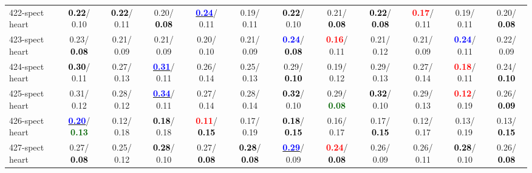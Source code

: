 \begin{table}[h]
\begin{center}
{\begin{tabular}{lc|c|c|c|c|c|c|c|c|c|c}
422-spect heart & \textcolor{black}{\textbf{  0.22}}/  0.10 & \textcolor{black}{\textbf{  0.22}}/  0.11 &   0.20/\textcolor{black}{\textbf{  0.08}} & \underline{\textcolor{blue}{\textbf{  0.24}}}/  0.11 &   0.19/  0.11 & \textcolor{black}{\textbf{  0.22}}/  0.10 &   0.21/\textcolor{black}{\textbf{  0.08}} & \textcolor{black}{\textbf{  0.22}}/\textcolor{black}{\textbf{  0.08}} & \textcolor{red}{\textbf{  0.17}}/  0.11 &   0.19/  0.11 &   0.20/\textcolor{black}{\textbf{  0.08}} \\
423-spect heart &   0.23/\textcolor{black}{\textbf{  0.08}} &   0.21/  0.09 &   0.21/  0.09 &   0.20/  0.10 &   0.21/  0.09 & \textcolor{blue}{\textbf{  0.24}}/\textcolor{black}{\textbf{  0.08}} & \textcolor{red}{\textbf{  0.16}}/  0.11 &   0.21/  0.12 &   0.21/  0.09 & \textcolor{blue}{\textbf{  0.24}}/  0.11 &   0.22/  0.09 \\ \hline
424-spect heart & \textcolor{black}{\textbf{  0.30}}/  0.11 &   0.27/  0.13 & \underline{\textcolor{blue}{\textbf{  0.31}}}/  0.11 &   0.26/  0.14 &   0.25/  0.13 &   0.29/\textcolor{black}{\textbf{  0.10}} &   0.19/  0.12 &   0.29/  0.13 &   0.27/  0.14 & \textcolor{red}{\textbf{  0.18}}/  0.11 &   0.24/\textcolor{black}{\textbf{  0.10}} \\
425-spect heart &   0.31/  0.12 &   0.28/  0.12 & \underline{\textcolor{blue}{\textbf{  0.34}}}/  0.11 &   0.27/  0.14 &   0.28/  0.14 & \textcolor{black}{\textbf{  0.32}}/  0.10 &   0.29/\textcolor{darkgreen}{\textbf{  0.08}} & \textcolor{black}{\textbf{  0.32}}/  0.10 &   0.29/  0.13 & \textcolor{red}{\textbf{  0.12}}/  0.19 &   0.26/\textcolor{black}{\textbf{  0.09}} \\
426-spect heart & \underline{\textcolor{blue}{\textbf{  0.20}}}/\textcolor{darkgreen}{\textbf{  0.13}} &   0.12/  0.18 & \textcolor{black}{\textbf{  0.18}}/  0.18 & \textcolor{red}{\textbf{  0.11}}/\textcolor{black}{\textbf{  0.15}} &   0.17/  0.19 & \textcolor{black}{\textbf{  0.18}}/\textcolor{black}{\textbf{  0.15}} &   0.16/  0.17 &   0.17/\textcolor{black}{\textbf{  0.15}} &   0.12/  0.17 &   0.13/  0.19 &   0.13/\textcolor{black}{\textbf{  0.15}} \\
427-spect heart &   0.27/\textcolor{black}{\textbf{  0.08}} &   0.25/  0.12 & \textcolor{black}{\textbf{  0.28}}/  0.10 &   0.27/\textcolor{black}{\textbf{  0.08}} & \textcolor{black}{\textbf{  0.28}}/\textcolor{black}{\textbf{  0.08}} & \underline{\textcolor{blue}{\textbf{  0.29}}}/  0.09 & \textcolor{red}{\textbf{  0.24}}/\textcolor{black}{\textbf{  0.08}} &   0.26/  0.09 &   0.26/  0.11 & \textcolor{black}{\textbf{  0.28}}/  0.10 &   0.26/\textcolor{black}{\textbf{  0.08}} \\

\end{tabular}}
\end{center}
\end{table}
